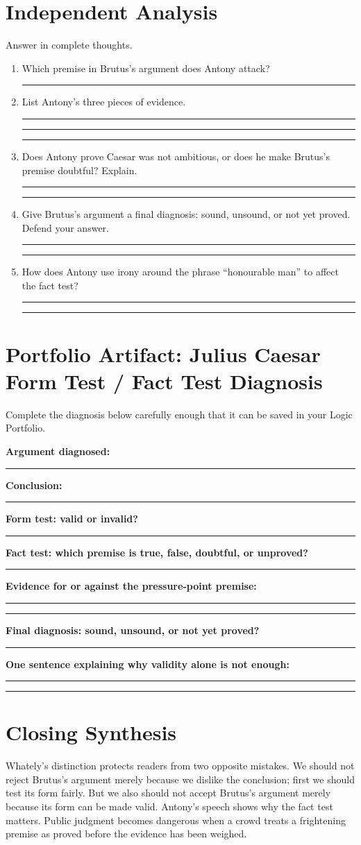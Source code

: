 \documentclass[12pt]{article}
\newcommand{\studentline}{\par\vspace{0.68em}\hrule\vspace{0.72em}}
\begin{document}
\section*{Independent Analysis}
Answer in complete thoughts.
\begin{enumerate}[leftmargin=*]
\item Which premise in Brutus's argument does Antony attack?\studentline
\item List Antony's three pieces of evidence.\studentline\studentline\studentline
\item Does Antony prove Caesar was not ambitious, or does he make Brutus's premise doubtful? Explain.\studentline\studentline
\item Give Brutus's argument a final diagnosis: sound, unsound, or not yet proved. Defend your answer.\studentline\studentline
\item How does Antony use irony around the phrase ``honourable man'' to affect the fact test?\studentline\studentline
\end{enumerate}

\section*{Portfolio Artifact: Julius Caesar Form Test / Fact Test Diagnosis}
Complete the diagnosis below carefully enough that it can be saved in your Logic Portfolio.

\textbf{Argument diagnosed:}\studentline
\textbf{Conclusion:}\studentline
\textbf{Form test: valid or invalid?}\studentline
\textbf{Fact test: which premise is true, false, doubtful, or unproved?}\studentline
\textbf{Evidence for or against the pressure-point premise:}\studentline\studentline
\textbf{Final diagnosis: sound, unsound, or not yet proved?}\studentline
\textbf{One sentence explaining why validity alone is not enough:}\studentline\studentline

\section*{Closing Synthesis}
Whately's distinction protects readers from two opposite mistakes. We should not reject Brutus's argument merely because we dislike the conclusion; first we should test its form fairly. But we also should not accept Brutus's argument merely because its form can be made valid. Antony's speech shows why the fact test matters. Public judgment becomes dangerous when a crowd treats a frightening premise as proved before the evidence has been weighed.
\end{document}
